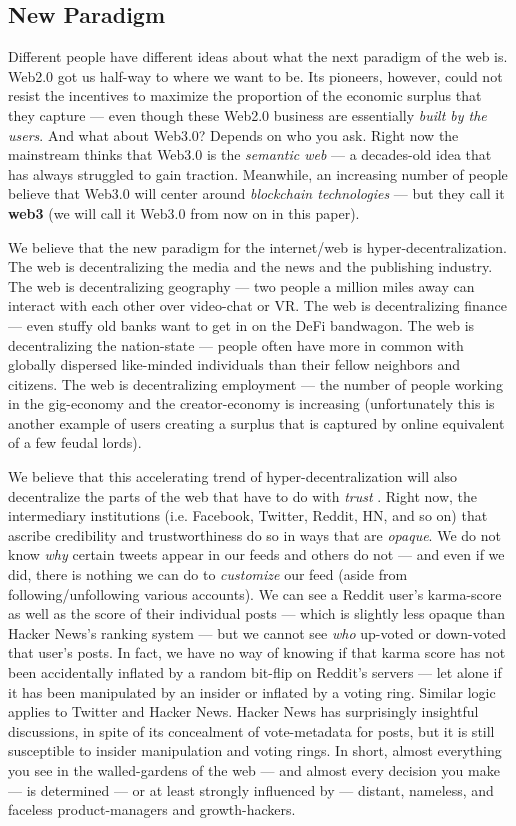 \documentclass[a4paper]{article}
\begin{document}
\subsection{New Paradigm}
Different people have different ideas about what the next paradigm of
the web is. Web2.0 got us half-way to where we want to be. Its pioneers,
however, could not resist the incentives to maximize the proportion of
the economic surplus that they capture --- even though these Web2.0
business are essentially \emph{built by the users}. And what about
Web3.0? Depends on who you ask. Right now the mainstream thinks that
Web3.0 is the \emph{semantic web} --- a decades-old idea that has
always struggled to gain traction. Meanwhile, an increasing number of
people believe that Web3.0 will center around \emph{blockchain
technologies} --- but they call it \textbf{web3} (we will call it
Web3.0 from now on in this paper).

We believe that the new paradigm for the internet/web is
hyper-decentralization. The web is decentralizing the media and the news
and the publishing industry. The web is decentralizing geography --- two
people a million miles away can interact with each other over video-chat
or VR. The web is decentralizing finance --- even stuffy old banks want
to get in on the DeFi bandwagon. The web is decentralizing the
nation-state --- people often have more in common with globally
dispersed like-minded individuals than their fellow neighbors and
citizens. The web is decentralizing employment --- the number of people
working in the gig-economy and the creator-economy is increasing
(unfortunately this is another example of users creating a surplus that
is captured by online equivalent of a few feudal lords).

We believe that this accelerating trend of hyper-decentralization will
also decentralize the parts of the web that have to do with \emph{trust
}. Right now, the intermediary institutions (i.e. Facebook, Twitter,
Reddit, HN, and so on) that ascribe credibility and trustworthiness do
so in ways that are \emph{opaque}. We do not know \emph{why} certain
tweets appear in our feeds and others do not --- and even if we did,
there is nothing we can do to \emph{customize} our feed (aside from
following/unfollowing various accounts). We can see a Reddit user's
karma-score as well as the score of their individual posts --- which is
slightly less opaque than Hacker News's ranking system --- but we cannot
see \emph{who} up-voted or down-voted that user's posts. In fact, we
have no way of knowing if that karma score has not been accidentally
inflated by a random bit-flip on Reddit's servers --- let alone if it
has been manipulated by an insider or inflated by a voting ring. Similar
logic applies to Twitter and Hacker News. Hacker News has surprisingly
insightful discussions, in spite of its concealment of vote-metadata for
posts, but it is still susceptible to insider manipulation and voting
rings. In short, almost everything you see in the walled-gardens of the
web --- and almost every decision you make --- is determined --- or at
least strongly influenced by --- distant, nameless, and faceless
product-managers and growth-hackers.
\end{document}
